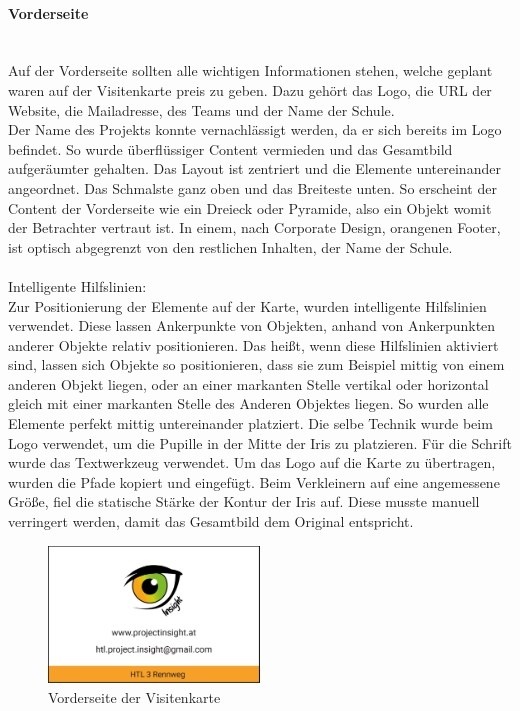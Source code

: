 \paragraph{Vorderseite}
\leavevmode \\
Auf der Vorderseite sollten alle wichtigen Informationen stehen, welche geplant waren auf der Visitenkarte preis zu geben. Dazu gehört das Logo, die URL der Website, die Mailadresse, des Teams und der Name der Schule.
\leavevmode \\
Der Name des Projekts konnte vernachlässigt werden, da er sich bereits im Logo befindet. So wurde überflüssiger Content vermieden und das Gesamtbild aufgeräumter gehalten. Das Layout ist zentriert und die Elemente untereinander angeordnet. Das Schmalste ganz oben und das Breiteste unten. So erscheint der Content der Vorderseite wie ein Dreieck oder Pyramide, also ein Objekt womit der Betrachter vertraut ist. In einem, nach Corporate Design, orangenen Footer, ist optisch abgegrenzt von den restlichen Inhalten, der Name der Schule.
\leavevmode \\
\leavevmode \\
Intelligente Hilfslinien: 
\leavevmode \\
Zur Positionierung der Elemente auf der Karte, wurden intelligente Hilfslinien verwendet. Diese lassen Ankerpunkte von Objekten, anhand von Ankerpunkten anderer Objekte relativ positionieren. Das heißt, wenn diese Hilfslinien aktiviert sind, lassen sich Objekte so positionieren, dass sie zum Beispiel mittig von einem anderen Objekt liegen, oder an einer markanten Stelle vertikal oder horizontal gleich mit einer markanten Stelle des Anderen Objektes liegen. So wurden alle Elemente perfekt mittig untereinander platziert. Die selbe Technik wurde beim Logo verwendet, um die Pupille in der Mitte der Iris zu platzieren. Für die Schrift wurde das Textwerkzeug verwendet. Um das Logo auf die Karte zu übertragen, wurden die Pfade kopiert und eingefügt. Beim Verkleinern auf eine angemessene Größe, fiel die statische Stärke der Kontur der Iris auf. Diese musste manuell verringert werden, damit das Gesamtbild dem Original entspricht.\cite{lines}

\begin{figure}[H] 
  \centering
     \includegraphics[width=0.5\textwidth]{design_abb6.png}
  \caption{Vorderseite der Visitenkarte}
\end{figure}

